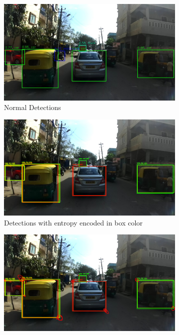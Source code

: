     \begin{figure}[ht]
    	\centering
    	\begin{subfigure}[t]{0.495\textwidth}
    		\centering
    		\includegraphics[width=\textwidth]{images/det_images/idd_1.jpg}
    		\caption{Normal Detections}
    	\end{subfigure}
    	\begin{subfigure}[t]{0.495\textwidth}
    		\centering
    		\includegraphics[width=\textwidth]{images/det_images/subensemble_entropies_idd_1.png}
    		\caption{Detections with entropy encoded in box color}
    	\end{subfigure}
    	\begin{subfigure}[t]{0.495\textwidth}
    		\centering
    		\includegraphics[width=\textwidth]{images/det_images/idd_subens_variances_1.png}

\end{subfigure}
\end{figure}
